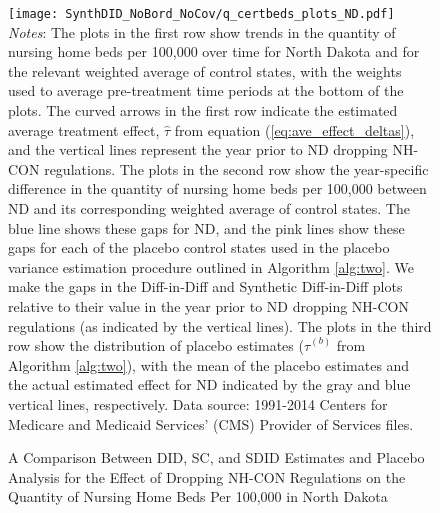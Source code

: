 \documentclass[../Main.tex]{subfiles}
\begin{document}
\newpage
{}
\begin{figure}[t] 
    \setlength{}
	\caption{\label{fig:q_certbeds_plots_nd} \centering A Comparison Between DID, SC, and SDID Estimates and Placebo Analysis for the Effect of Dropping NH-CON Regulations on the Quantity of Nursing Home Beds Per 100,000 in North Dakota} {\centering\texttt{[image: SynthDID\_NoBord\_NoCov/q\_certbeds\_plots\_ND.pdf]}}
    \vspace{-1.4cm}\\
    \scriptsize
		\textit{Notes}: The plots in the first row show trends in the quantity of nursing home beds per 100,000 over time for North Dakota and for the relevant weighted average of control states, with the weights used to average pre-treatment time periods at the bottom of the plots. The curved arrows in the first row indicate the estimated average treatment effect, $\hat{\tau}$ from equation (\ref{eq:ave_effect_deltas}), and the vertical lines represent the year prior to ND dropping NH-CON regulations. The plots in the second row show the year-specific difference in the quantity of nursing home beds per 100,000 between ND and its corresponding weighted average of control states. The blue line shows these gaps for ND, and the pink lines show these gaps for each of the placebo control states used in the placebo variance estimation procedure outlined in Algorithm \ref{alg:two}. We make the gaps in the Diff-in-Diff and Synthetic Diff-in-Diff plots relative to their value in the year prior to ND dropping NH-CON regulations (as indicated by the vertical lines). The plots in the third row show the distribution of placebo estimates ($\hat{\tau}^{(b)}$ from Algorithm \ref{alg:two}), with the mean of the placebo estimates and the actual estimated effect for ND indicated by the gray and blue vertical lines, respectively. Data source: 1991-2014 Centers for Medicare and Medicaid Services’ (CMS) Provider of Services files.
\end{figure}
\restoregeometry
\clearpage
\end{document}
